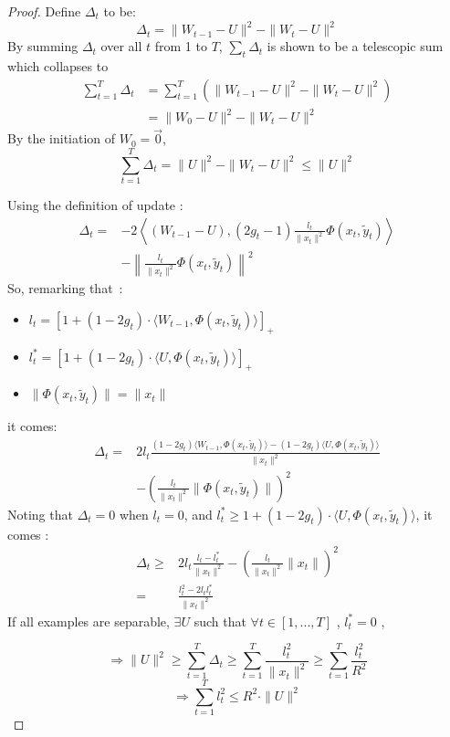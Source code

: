 \documentclass[twocolumn]{article}
\begin{document}
\begin{proof}
	Define $\Delta_t$ to be:
	\[\Delta_t = \parallel{W_{t-1}-U}\parallel^2-\parallel{W_t-U}\parallel^2\]
	By summing $\Delta_t$ over all $t$ from 1 to $T$,  $\sum_t \Delta_t$ is shown to be a telescopic sum which collapses to
	\begin{align}
    \sum_{t=1}^{T}\Delta_t &= \sum_{t=1}^{T} \left( \parallel{W_{t-1} - U}\parallel^2-\parallel{W_t - U}\parallel^2 \right)\nonumber\\ 
    &= \parallel{W_0 - U}\parallel^2-\parallel{W_t-U}\parallel^2\nonumber
	\end{align}	
	By the initiation of $W_0 = \vec{0}$, 
	\begin{equation}
	\label{equa:delta}
	\sum_{t=1}^{T}\Delta_t = \parallel{U}\parallel^2 - \parallel{W_t-U}\parallel^2 \leqslant \parallel{U}\parallel^2 
	\end{equation}
	
	Using the definition of update : %
	\begin{align}
	\Delta_t =& -2\left\langle (W_{t-1} - U), (2g_t-1)\frac{l_t}{\parallel{x_t}\parallel^2}\Phi(x_t,\tilde{y}_t)\right\rangle \nonumber\\
	&- \left\| \frac{l_t}{\parallel{x_t}\parallel^2}\Phi(x_t,\tilde{y}_t)\right\|^2
	\nonumber
	\end{align}
	So, remarking that~:
	\begin{itemize}
		\item[] $l_t = [1+(1-2g_t)\cdot\langle W_{t-1},\Phi(x_t,\tilde{y}_t)\rangle]_+$
		\item[] $l_t^{\ast} = [1+(1-2g_t)\cdot\langle U,\Phi(x_t,\tilde{y}_t)\rangle]_+$
		\item[] $\parallel{\Phi(x_t,\tilde{y}_t)}\parallel = \parallel x_t\parallel$
	\end{itemize}
	it comes:
	\begin{align}
	\Delta_t =& 2l_t\frac{(1-2g_t)\langle W_{t-1}, \Phi(x_t,\tilde{y}_t)\rangle - (1-2g_t)\langle U, \Phi(x_t,\tilde{y}_t)\rangle}{\|x_t\|^2} \nonumber\\
	&-\left( \frac{l_t}{\parallel{x_t}\parallel^2}\parallel{\Phi(x_t,\tilde{y}_t)}\parallel \right)^2\nonumber
	\end{align}
	Noting that $\Delta_t = 0$ when $l_t = 0$, and $l^*_t \geq  1+(1-2g_t)\cdot\langle U,\Phi(x_t,\tilde{y}_t)\rangle$, it comes : 
	\begin{align}
	\Delta_t\geqslant& 2l_t\frac{l_t - l_t^{\ast}}{\parallel{x_t}\parallel^2}-\left( \frac{l_t}{\parallel{x_t}\parallel^2}\parallel x_t\parallel \right)^2\nonumber\\
	=& \frac{l_t^2-2l_t l_t^{\ast}}{\parallel x_t\parallel^2}\nonumber
	\end{align}
	If all examples are separable, $\exists U$ such that $\forall t \in [1,...,T]$ , $l_t^{\ast} = 0$ ,
	
	\[\Rightarrow \parallel{U}\parallel^2 \geqslant \sum_{t=1}^{T}\Delta_t \geqslant \sum_{t=1}^{T}  \frac{l_t^2}{\parallel{x_t}\parallel^2}
	\geqslant 
	\sum_{t=1}^{T}  \frac{l_t^2}{R^2}
	\]
	\[\Rightarrow\sum_{t=1}^{T} l_t^2 \leqslant R^2 \cdot \parallel{U}\parallel^2\]
\end{proof}
\end{document}
